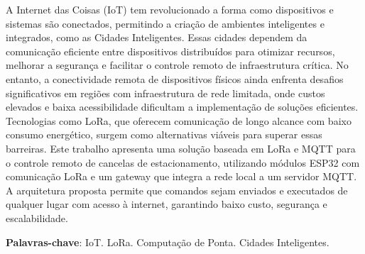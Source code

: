\documentclass[
article,			%
11pt,				%
twoside,			%
a4paper,			%
section=TITLE,		%
onecolumn,          %
english,			%
brazil,				%
sumario=tradicional
]{abntex2}
\begin{document}
\frenchspacing 


\begin{resumo}
    A Internet das Coisas (IoT) tem revolucionado a forma como dispositivos e sistemas são conectados, permitindo a criação de ambientes inteligentes e integrados, como as Cidades Inteligentes. Essas cidades dependem da comunicação eficiente entre dispositivos distribuídos para otimizar recursos, melhorar a segurança e facilitar o controle remoto de infraestrutura crítica. No entanto, a conectividade remota de dispositivos físicos ainda enfrenta desafios significativos em regiões com infraestrutura de rede limitada, onde custos elevados e baixa acessibilidade dificultam a implementação de soluções eficientes. Tecnologias como LoRa, que oferecem comunicação de longo alcance com baixo consumo energético, surgem como alternativas viáveis para superar essas barreiras. Este trabalho apresenta uma solução baseada em LoRa e MQTT para o controle remoto de cancelas de estacionamento, utilizando módulos ESP32 com comunicação LoRa e um gateway que integra a rede local a um servidor MQTT. A arquitetura proposta permite que comandos sejam enviados e executados de qualquer lugar com acesso à internet, garantindo baixo custo, segurança e escalabilidade.

    \noindent
    \textbf{Palavras-chave}: IoT. LoRa. Computação de Ponta. Cidades Inteligentes.
\end{resumo}
    
\end{document}
